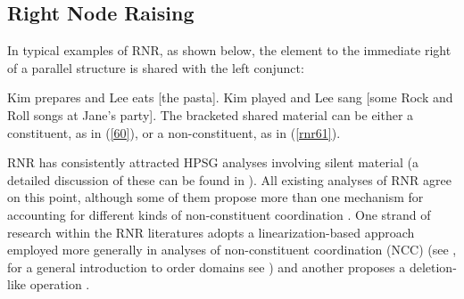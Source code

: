 \iffalse{
\citet{Abeille2014} offer additional evidence from \ili{Romance} (e.g., case mismatch between gapping remnants and their counterparts and even more possibilities of ordering remnants than is the case in \ili{English}) to strengthen their point that syntactic identity is relaxed under gapping.\footnote{As
for scope ambiguities and ellipsis in gapping, see \citet{Yatabe2001} and \crossrefchapteralt{coordination}.}

There are three further key assumptions in Abeill\'{e} et al.'s (2014) analysis. First, two (or more) gapping remnants form a cluster whose mother has an underspecified syntactic category, that is, is a non-headed phrase (this information is represented by the Cluster head feature in (\ref{66})). This phrase then serves as the head daughter of a head-fragment phrase, whose syntactic category is also underspecified. This means that there is no unpronounced verbal head in the phrase to which gapping remnants belong. Second, the meanings of the gapping remnants are computed from the meaning of the rightmost nonelliptical verbal conjunct, as represented by the Source feature in (\ref{66}). Finally, the conjuncts are linked by a symmetric discourse relation (i.e.,  parallelism or contrast) that is part of the Background feature in (\ref{66}).
}\fi



\subsection{Right Node Raising}
\label{ellipsis:sec-rnr}

In typical examples of RNR, as shown below, the element to the immediate right of a parallel structure is shared with the left conjunct:

\eal
\label{ex-kim-prepares-and-Lee-eats-Kim-played-and-Lee-sang}
\ex  Kim prepares and Lee eats [the pasta].  \label{60}
\ex  Kim played and Lee sang [some Rock and Roll songs at Jane's party]. \label{rnr61}
\zl
%
The bracketed shared material can be either a constituent, as in (\ref{60}), or a non-constituent, as in (\ref{rnr61}).

RNR has consistently attracted HPSG analyses involving silent material (a detailed discussion of these can be found
in ). 
All existing analyses of RNR \citep{Abeille2016, Beavers2004, Chaves2014, Crysmann2003, Shiraishi2019, Yatabe2001, Yatabe2012} agree on this point,
although some of them propose more than one mechanism for accounting for different kinds of non-constituent coordination \citep{Chaves2014, Yatabe2001, Yatabe2012, Yatabe2019}. One strand of research within the RNR literatures adopts a linearization-based approach employed more generally in analyses of non-constituent coordination (NCC) (see \citealt{Yatabe2001, Yatabe2012}, for a general introduction to order domains see ) and another proposes a deletion-like operation \citep{Abeille2016, Chaves2014, Shiraishi2019}.

